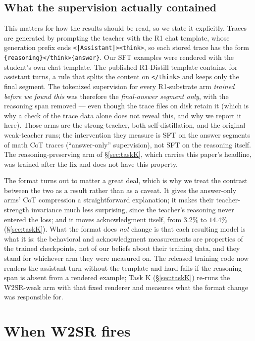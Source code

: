 \documentclass{article}
\begin{document}
\subsection{What the supervision actually contained}
\label{sec:supervision}
This matters for how the results should be read, so we state it explicitly.
Traces are generated by prompting the teacher with the R1 chat template, whose
generation prefix ends \texttt{<|Assistant|><think>}, so each stored trace has
the form \texttt{\{reasoning\}</think>\{answer\}}. Our SFT examples were
rendered with the student's own chat template. The published
R1-Distill template contains, for assistant turns, a rule that splits the
content on \texttt{</think>} and keeps only the final segment. The tokenized
supervision for every R1-substrate arm \emph{trained before we found this} was
therefore the \emph{final-answer segment only}, with the reasoning span removed
--- even though the trace files on disk retain it (which is why a check of the
trace data alone does not reveal this, and why we report it here). Those arms
are the strong-teacher, both self-distillation, and the original weak-teacher
runs; the intervention they measure is SFT on the answer segments of math CoT
traces (``answer-only'' supervision), not SFT on the reasoning itself. The
reasoning-preserving arm of \S\ref{sec:taskK}, which carries this paper's
headline, was trained after the fix and does not have this property.

The format turns out to matter a great deal, which is why we treat the contrast
between the two as a result rather than as a caveat. It gives the answer-only
arms' CoT compression a straightforward explanation; it makes their
teacher-strength invariance much less surprising, since the teacher's reasoning
never entered the loss; and it moves acknowledgment itself, from $3.2\%$ to
$14.4\%$ (\S\ref{sec:taskK}). What the format does \emph{not} change is that
each resulting model is what it is: the behavioral and acknowledgment
measurements are properties of the trained checkpoints, not of our beliefs
about their training data, and they stand for whichever arm they were measured
on. The
released training code now renders the assistant turn without the template and
hard-fails if the reasoning span is absent from a rendered example; Task K
(\S\ref{sec:taskK}) re-runs the W2SR-weak arm with that fixed renderer and
measures what the format change was responsible for.

\section{When W2SR fires}
\label{sec:repro}
\end{document}
